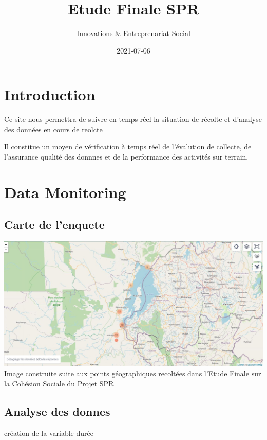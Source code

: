 \documentclass[
]{book}
\title{Etude Finale SPR}
\author{Innovations \& Entreprenariat Social}
\date{2021-07-06}
\begin{document}
\maketitle

{
\setcounter{tocdepth}{1}
\tableofcontents
}
\hypertarget{introduction}{%
\chapter{Introduction}\label{introduction}}

Ce site nous permettra de suivre en temps réel la situation de récolte et d'analyse des données en cours de reolcte

Il constitue un moyen de vérification à temps réel de l'évalution de collecte, de l'assurance qualité des donnnes et de la performance des activités sur terrain.

\hypertarget{data-monitoring}{%
\chapter{Data Monitoring}\label{data-monitoring}}

\hypertarget{carte-de-lenquete}{%
\section{Carte de l'enquete}\label{carte-de-lenquete}}

\includegraphics{Carte_enquete.JPG}
Image construite suite aux points géographiques recoltées dans l'Etude Finale sur la Cohésion Sociale du Projet SPR

\hypertarget{analyse-des-donnes}{%
\section{Analyse des donnes}\label{analyse-des-donnes}}

création de la variable durée
\end{document}
